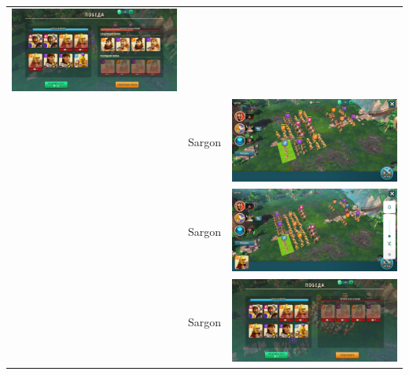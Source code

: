 \begin{longtable}{|c|c|c|}
    \includegraphics[width=0.75\linewidth]{./parts/media/TreasureHunt/35/sargon/photo_2022-04-07_10-08-41.jpg} \\
    & Sargon &
    \includegraphics[width=0.75\linewidth]{./parts/media/TreasureHunt/35/sargon/photo_2022-04-07_10-08-45.jpg} \\
    & Sargon &
    \includegraphics[width=0.75\linewidth]{./parts/media/TreasureHunt/35/sargon/photo_2022-04-07_10-08-33.jpg} \\
    & Sargon &
    \includegraphics[width=0.75\linewidth]{./parts/media/TreasureHunt/35/sargon/photo_2022-04-07_10-08-48.jpg} \\

\end{longtable}
